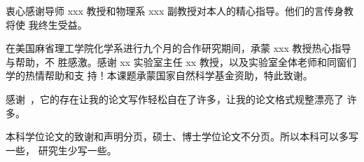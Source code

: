 

\begin{ack}
  衷心感谢导师 xxx 教授和物理系 xxx 副教授对本人的精心指导。他们的言传身教将使
  我终生受益。

  在美国麻省理工学院化学系进行九个月的合作研究期间，承蒙 xxx 教授热心指导与帮助，不
  胜感激。感谢 xx 实验室主任 xx 教授，以及实验室全体老师和同窗们学的热情帮助和支
  持！本课题承蒙国家自然科学基金资助，特此致谢。

  感谢~\thuthesis，它的存在让我的论文写作轻松自在了许多，让我的论文格式规整漂亮了
  许多。

  本科学位论文的致谢和声明分页，硕士、博士学位论文不分页。所以本科可以多写一些，
  研究生少写一些。
\end{ack}
